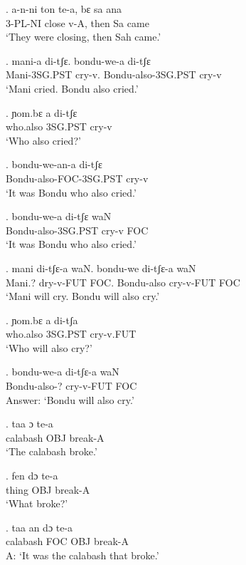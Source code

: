\documentclass{assets/fieldnotes}
\begin{document}
\exg.
a-n-ni    ton     te-a,   bɛ     sa   ana  \\
3-PL-NI   close   v-A,    then   Sa   came \\%
`They were closing, then Sah came.'

\exg.
mani-a     di-tʃɛ.   bondu-we-a       di-tʃɛ \\
Mani-3SG.PST   cry-v.    Bondu-also-3SG.PST   cry-v  \\%
`Mani cried. Bondu also cried.'

\exg.
ɲom.bɛ   a     di-tʃɛ \\
who.also     3SG.PST   cry-v  \\%
`Who also cried?'

\exg.
bondu-we-an-a        di-tʃɛ \\
Bondu-also-FOC-3SG.PST   cry-v  \\%
`It was Bondu who also cried.'

\exg.
bondu-we-a       di-tʃɛ   waN \\
Bondu-also-3SG.PST   cry-v    FOC \\%
`It was Bondu who also cried.'

\exg.
mani     di-tʃɛ-a    waN.   bondu-we     di-tʃɛ-a    waN \\
Mani.?   dry-v-FUT   FOC.   Bondu-also   cry-v-FUT   FOC \\%
`Mani will cry. Bondu will also cry.'


\exg.
ɲom.bɛ     a     di-tʃa    \\
who.also   3SG.PST   cry-v.FUT \\%
`Who will also cry?'

\exg.
bondu-we-a     di-tʃɛ-a    waN \\
Bondu-also-?   cry-v-FUT   FOC \\%
Answer: `Bondu will also cry.'

\exg.
taa        ɔ     te-a    \\
calabash   OBJ   break-A \\%
`The calabash broke.'

\exg.
fen     dɔ    te-a    \\
thing   OBJ   break-A \\%
`What broke?'

\exg.
taa        an    dɔ    te-a    \\
calabash   FOC   OBJ   break-A \\%
A: `It was the calabash that broke.'
\end{document}
